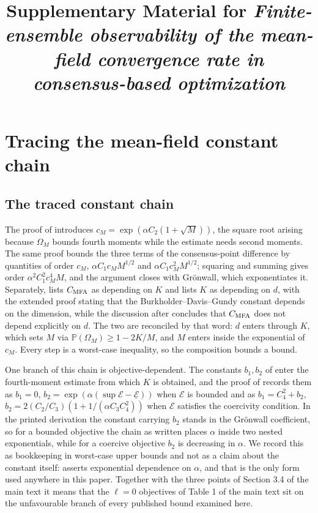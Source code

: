\documentclass[sn-mathphys-num]{sn-jnl}
\title[Supplementary Material]{Supplementary Material for \emph{Finite-ensemble observability of the mean-field convergence rate in consensus-based optimization}}
\author*[1]{\fnm{Rahul Kumar} \sur{Mishra}}\email{mishra.rahul98@gmail.com}
\affil[1]{Independent Researcher, Ranchi, Jharkhand, India}
\theoremstyle{plain}
\theoremstyle{remark}
\begin{document}
\maketitle

\section{Tracing the mean-field constant chain}\label{S1}

\subsection{The traced constant chain}\label{app:tracing}
The proof of \cite[Proposition 3.11]{fkr2024} introduces $c_M=\exp(\alpha C_2(1+\sqrt M))$, the square root arising because $\Omega_M$ bounds fourth moments while the estimate needs second moments. The same proof bounds the three terms of the consensus-point difference by quantities of order $c_M$, $\alpha C_1c_MM^{1/2}$ and $\alpha C_1c_M^2M^{1/2}$; squaring and summing gives order $\alpha^2C_1^2c_M^4M$, and the argument closes with Gr\"onwall, which exponentiates it. Separately, \cite[Proposition 3.11]{fkr2024} lists $C_{\rm MFA}$ as depending on $K$ and \cite[Lemma 3.10]{fkr2024} lists $K$ as depending on $d$, with the extended proof stating that the Burkholder--Davis--Gundy constant depends on the dimension, while the discussion after \cite[Theorem 3.8]{fkr2024} concludes that $C_{\rm MFA}$ does not depend explicitly on $d$. The two are reconciled by that word: $d$ enters through $K$, which sets $M$ via $\mathbb P(\Omega_M)\ge1-2K/M$, and $M$ enters inside the exponential of $c_M$. Every step is a worst-case inequality, so the composition bounds a bound.

One branch of this chain is objective-dependent. The constants $b_1,b_2$ of \cite[Lemma 3.3]{carrillo2018} enter the fourth-moment estimate from which $K$ is obtained, and the proof of \cite[Lemma 3.10]{fkr2024} records them as $b_1=0$, $b_2=\exp(\alpha(\sup\mathcal E-\underline{\mathcal E}))$ when $\mathcal E$ is bounded and as $b_1=C_4^2+b_2$, $b_2=2(C_2/C_3)(1+1/(\alpha C_3C_4^2))$ when $\mathcal E$ satisfies the coercivity condition. In the printed derivation the constant carrying $b_2$ stands in the Gr\"onwall coefficient, so for a bounded objective the chain as written places $\alpha$ inside two nested exponentials, while for a coercive objective $b_2$ is decreasing in $\alpha$. We record this as bookkeeping in worst-case upper bounds and not as a claim about the constant itself: \cite[Theorem 3.8]{fkr2024} asserts exponential dependence on $\alpha$, and that is the only form used anywhere in this paper. Together with the three points of Section 3.4 of the main text it means that the $\ell=0$ objectives of Table 1 of the main text sit on the unfavourable branch of every published bound examined here.
\end{document}
